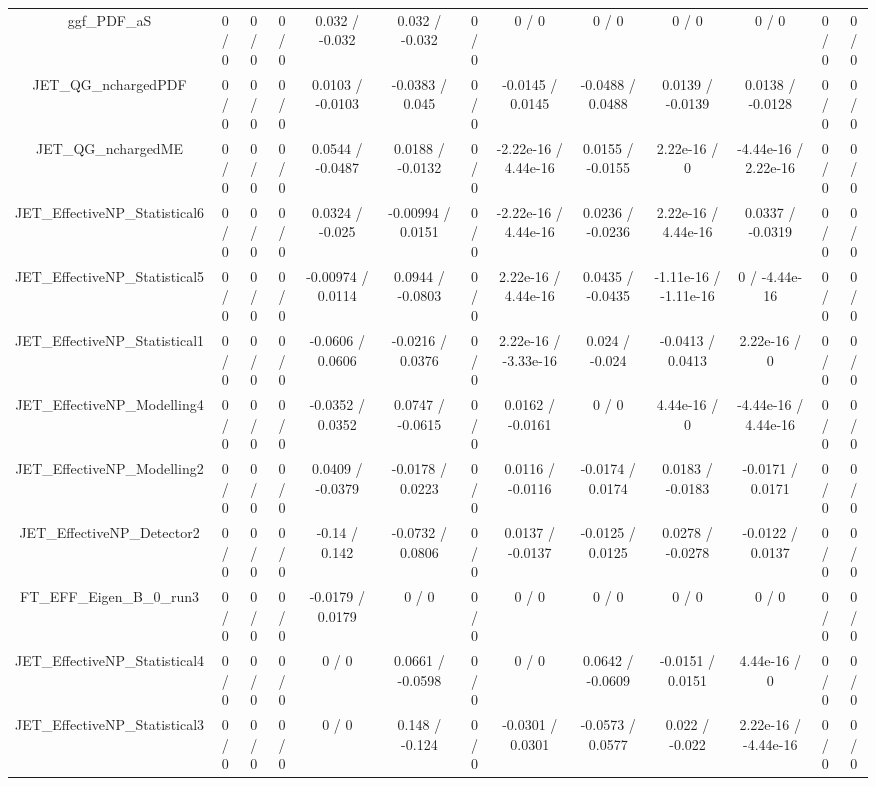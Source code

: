 \documentclass[10pt]{article}
\begin{document}
\begin{table}[htbp]
\begin{center}
\begin{tabular}{|c|c|c|c|c|c|c|c|c|c|c|c|c|}
  ggf_PDF_aS & 0 / 0 & 0 / 0 & 0 / 0 & 0.032 / -0.032 & 0.032 / -0.032 & 0 / 0 & 0 / 0 & 0 / 0 & 0 / 0 & 0 / 0 & 0 / 0 & 0 / 0 \\ 
  JET_QG_nchargedPDF & 0 / 0 & 0 / 0 & 0 / 0 & 0.0103 / -0.0103 & -0.0383 / 0.045 & 0 / 0 & -0.0145 / 0.0145 & -0.0488 / 0.0488 & 0.0139 / -0.0139 & 0.0138 / -0.0128 & 0 / 0 & 0 / 0 \\ 
  JET_QG_nchargedME & 0 / 0 & 0 / 0 & 0 / 0 & 0.0544 / -0.0487 & 0.0188 / -0.0132 & 0 / 0 & -2.22e-16 / 4.44e-16 & 0.0155 / -0.0155 & 2.22e-16 / 0 & -4.44e-16 / 2.22e-16 & 0 / 0 & 0 / 0 \\ 
  JET_EffectiveNP_Statistical6 & 0 / 0 & 0 / 0 & 0 / 0 & 0.0324 / -0.025 & -0.00994 / 0.0151 & 0 / 0 & -2.22e-16 / 4.44e-16 & 0.0236 / -0.0236 & 2.22e-16 / 4.44e-16 & 0.0337 / -0.0319 & 0 / 0 & 0 / 0 \\ 
  JET_EffectiveNP_Statistical5 & 0 / 0 & 0 / 0 & 0 / 0 & -0.00974 / 0.0114 & 0.0944 / -0.0803 & 0 / 0 & 2.22e-16 / 4.44e-16 & 0.0435 / -0.0435 & -1.11e-16 / -1.11e-16 & 0 / -4.44e-16 & 0 / 0 & 0 / 0 \\ 
  JET_EffectiveNP_Statistical1 & 0 / 0 & 0 / 0 & 0 / 0 & -0.0606 / 0.0606 & -0.0216 / 0.0376 & 0 / 0 & 2.22e-16 / -3.33e-16 & 0.024 / -0.024 & -0.0413 / 0.0413 & 2.22e-16 / 0 & 0 / 0 & 0 / 0 \\ 
  JET_EffectiveNP_Modelling4 & 0 / 0 & 0 / 0 & 0 / 0 & -0.0352 / 0.0352 & 0.0747 / -0.0615 & 0 / 0 & 0.0162 / -0.0161 & 0 / 0 & 4.44e-16 / 0 & -4.44e-16 / 4.44e-16 & 0 / 0 & 0 / 0 \\ 
  JET_EffectiveNP_Modelling2 & 0 / 0 & 0 / 0 & 0 / 0 & 0.0409 / -0.0379 & -0.0178 / 0.0223 & 0 / 0 & 0.0116 / -0.0116 & -0.0174 / 0.0174 & 0.0183 / -0.0183 & -0.0171 / 0.0171 & 0 / 0 & 0 / 0 \\ 
  JET_EffectiveNP_Detector2 & 0 / 0 & 0 / 0 & 0 / 0 & -0.14 / 0.142 & -0.0732 / 0.0806 & 0 / 0 & 0.0137 / -0.0137 & -0.0125 / 0.0125 & 0.0278 / -0.0278 & -0.0122 / 0.0137 & 0 / 0 & 0 / 0 \\ 
  FT_EFF_Eigen_B_0_run3 & 0 / 0 & 0 / 0 & 0 / 0 & -0.0179 / 0.0179 & 0 / 0 & 0 / 0 & 0 / 0 & 0 / 0 & 0 / 0 & 0 / 0 & 0 / 0 & 0 / 0 \\ 
  JET_EffectiveNP_Statistical4 & 0 / 0 & 0 / 0 & 0 / 0 & 0 / 0 & 0.0661 / -0.0598 & 0 / 0 & 0 / 0 & 0.0642 / -0.0609 & -0.0151 / 0.0151 & 4.44e-16 / 0 & 0 / 0 & 0 / 0 \\ 
  JET_EffectiveNP_Statistical3 & 0 / 0 & 0 / 0 & 0 / 0 & 0 / 0 & 0.148 / -0.124 & 0 / 0 & -0.0301 / 0.0301 & -0.0573 / 0.0577 & 0.022 / -0.022 & 2.22e-16 / -4.44e-16 & 0 / 0 & 0 / 0 \\ 

\end{tabular}
\end{center}
\end{table}
\end{document}
